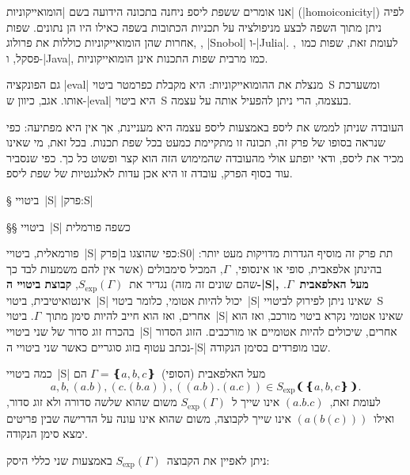 אנו אומרים ששפת ליספ ניחנה בתכונה הידועה בשם \ע|הומואייקוניות|
(\E|homoiconicity|) לפיה ניתן מתוך השפה לבצע מניפולציה על תכניות הכתובות בשפה
כאילו היו הן נתונים. שפות אחרות שהן הומואייקוניות כוללות את פרולוג, , \E|Snobol| ו-\E|Julia|. לעומת זאת, שפות כמו~\CPL, פסקל,
ו-\E|Java|, כמו מרבית שפות התכנות אינן הומואייקוניות.

גם הפונקציה \E|eval| מנצלת את ההומואייקוניות: היא מקבלת כפרמטר ביטוי~S ומשערכת
אותו. אגב, כיוון ש-\E|eval| היא ביטוי~S בעצמה, הרי ניתן להפעיל אותה על עצמה.

העובדה שניתן לממש את ליספ באמצעות ליספ עצמה היא מעניינת, אך אין היא מפתיעה: כפי
שנראה בסופו של פרק זה, תכונה זו מתקיימת כמעט בכל שפת תכנות. בכל זאת, מי שאינו
מכיר את ליספ, ודאי יופתע אולי מהעובדה שהמימוש הזה הוא קצר ופשוט כל כך. כפי
שנסביר עוד בסוף הפרק, עובדה זו היא אכן עדות לאלגנטיות של שפת ליספ.

§ ביטויי~\E|S|
|פרק:S|

§§ ביטויי~\E|S| כשפה פורמלית

\newcommand\SX{\ensuremath{S_{\text{exp}}}}

 פורמאלית, ביטויי~\E|S| כפי שהוצגו ב|פרק:S0| תת פרק זה מוסיף הגדרות
 מדויקות מעט יותר: בהינתן אלפאבית, סופי או אינסופי,~$Γ$, המכיל סימבולים (אשר
 אין להם משמעות לבד כך שהם שונים זה מזה) נגדיר את~$\SX(Γ)$, \textbf{קבוצת
 ביטויי ה-\E|S|, מעל האלפאבית~$Γ$}. אינטואיטיבית, ביטוי~\E|S| יכול
להיות אטומי, כלומר ביטוי~\E|S| שאינו ניתן לפירוק לביטויי~S אחרים, ואז הוא חייב
להיות סימן מתוך~$Γ$. ביטוי~\E|S| שאינו אטומי נקרא ביטוי מורכב, ואז הוא בהכרח
זוג סדור של שני ביטויי~\E|S| אחרים, שיכולים להיות אטומיים או מורכבים. הזוג
הסדור נכתב עטוף בזוג סוגריים כאשר שני ביטויי ה-\E|S| שבו מופרדים בסימן הנקודה.

כמה ביטויי~\E|S| מעל האלפאבית (הסופי)~$Γ=❴a,b,c❵$ הם \[
  a,b,(a.b),(c.(b.a)),((a.b).(a.c))∈\SX❨❴a,b,c❵❩.
\] לעומת זאת,~$(a.b.c)$ אינו שייך ל~$\SX(Γ)$ משום שהוא שלשה סדורה ולא זוג סדור,
ואילו~$(a(b(c)))$ אינו שייך לקבוצה, משום שהוא אינו עונה על הדרישה שבין פריטים
ימצא סימן הנקודה.

ניתן לאפיין את הקבוצה~$\SX(Γ)$ באמצעות שני כללי היסק:

